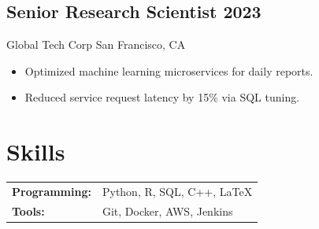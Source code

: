 \documentclass[a4paper,10pt]{article}
\newcommand{\subtext}[1]{#1\par\vspace{-0.2cm}}
\newcommand{\hskills}[1]{\textbf{#1}}
\newenvironment{zitemize}{
    \begin{itemize}[leftmargin=*, labelsep=0.5em, itemsep=0pt, parsep=1pt]
}{\end{itemize}\vspace{-0.2cm}}
\begin{document}
\subsection*{Senior Research Scientist \hfill 2023} 
\subtext{Global Tech Corp \hfill San Francisco, CA} 
\begin{zitemize}
    \item Optimized machine learning microservices for daily reports.
    \item Reduced service request latency by 15\% via SQL tuning.
\end{zitemize}

\section{Skills}
\begin{tabular}{>{\raggedright\arraybackslash}p{8em} p{40em}}
    \hskills{Programming:} & Python, R, SQL, C++, \LaTeX \\
    \hskills{Tools:} & Git, Docker, AWS, Jenkins \\
\end{tabular}
\end{document}
